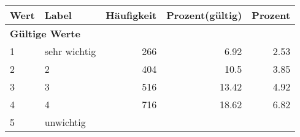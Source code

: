      \begin{longtable}{lXrrr}
     \toprule
     \textbf{Wert} & \textbf{Label} & \textbf{Häufigkeit} & \textbf{Prozent(gültig)} & \textbf{Prozent} \\
     \endhead
     \midrule
     \multicolumn{5}{l}{\textbf{Gültige Werte}}\\

     1 &
     \multicolumn{1}{X}{ sehr wichtig   } &


       \num{266} &
       \num[round-mode=places,round-precision=2]{6.92} &
         \num[round-mode=places,round-precision=2]{2.53} \\

     2 &
     \multicolumn{1}{X}{ 2   } &


       \num{404} &
       \num[round-mode=places,round-precision=2]{10.5} &
         \num[round-mode=places,round-precision=2]{3.85} \\

     3 &
     \multicolumn{1}{X}{ 3   } &


       \num{516} &
       \num[round-mode=places,round-precision=2]{13.42} &
         \num[round-mode=places,round-precision=2]{4.92} \\

     4 &
     \multicolumn{1}{X}{ 4   } &


       \num{716} &
       \num[round-mode=places,round-precision=2]{18.62} &
         \num[round-mode=places,round-precision=2]{6.82} \\

     5 &
     \multicolumn{1}{X}{ unwichtig   } &



\end{longtable}
